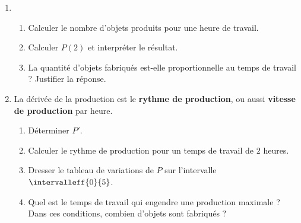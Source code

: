 \documentclass[11pt,openright,twoside,french]{book}
\begin{document}
\begin{enumerate}
    \item
        \begin{enumerate}
            \item Calculer le nombre d'objets produits pour une heure de travail.
            \item Calculer $P(2)$ et interpréter le résultat.
            \item La quantité d'objets fabriqués est-elle proportionnelle au temps de travail ? Justifier la réponse.
        \end{enumerate}
    \item La dérivée de la production est le \textbf{rythme de production}, ou aussi \textbf{vitesse de production} par heure.
        \begin{enumerate}
            \item Déterminer $P'$.
            \item Calculer le rythme de production pour un temps de travail de $2$ heures.
            \item Dresser le tableau de variations de $P$ sur l'intervalle $\intervalleff{0}{5}$.
            \item Quel est le temps de travail qui engendre une production maximale ? Dans ces conditions, combien d'objets sont fabriqués ?
        \end{enumerate}
\end{enumerate}
\end{document}
